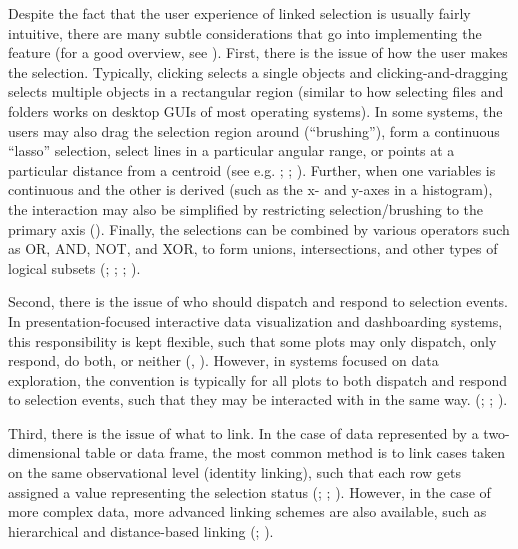 \documentclass[
]{book}
\theoremstyle{definition}
\theoremstyle{definition}
\theoremstyle{definition}
\theoremstyle{definition}
\theoremstyle{remark}
\begin{document}
Despite the fact that the user experience of linked selection is usually fairly intuitive, there are many subtle considerations that go into implementing the feature (for a good overview, see ). First, there is the issue of how the user makes the selection. Typically, clicking selects a single objects and clicking-and-dragging selects multiple objects in a rectangular region (similar to how selecting files and folders works on desktop GUIs of most operating systems). In some systems, the users may also drag the selection region around (``brushing''), form a continuous ``lasso'' selection, select lines in a particular angular range, or points at a particular distance from a centroid (see e.g. ; ; ). Further, when one variables is continuous and the other is derived (such as the x- and y-axes in a histogram), the interaction may also be simplified by restricting selection/brushing to the primary axis (). Finally, the selections can be combined by various operators such as OR, AND, NOT, and XOR, to form unions, intersections, and other types of logical subsets (; ; ; ).

Second, there is the issue of who should dispatch and respond to selection events. In presentation-focused interactive data visualization and dashboarding systems, this responsibility is kept flexible, such that some plots may only dispatch, only respond, do both, or neither (, ). However, in systems focused on data exploration, the convention is typically for all plots to both dispatch and respond to selection events, such that they may be interacted with in the same way. (; ; ).

Third, there is the issue of what to link. In the case of data represented by a two-dimensional table or data frame, the most common method is to link cases taken on the same observational level (identity linking), such that each row gets assigned a value representing the selection status (; ; ). However, in the case of more complex data, more advanced linking schemes are also available, such as hierarchical and distance-based linking (; ).
\end{document}

